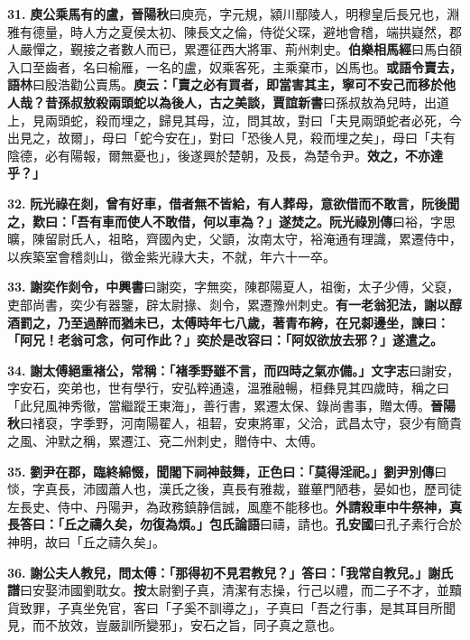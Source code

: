 \textbf{31.} \textbf{庾公乘馬有的盧，}{\footnotesize \textbf{晉陽秋}曰庾亮，字元規，潁川鄢陵人，明穆皇后長兄也，淵雅有德量，時人方之夏侯太初、陳長文之倫，侍從父琛，避地會稽，端拱嶷然，郡人嚴憚之，覲接之者數人而已，累遷征西大將軍、荊州刺史。\textbf{伯樂相馬經}曰馬白頟入口至齒者，名曰榆雁，一名的盧，奴乘客死，主乘棄市，凶馬也。}\textbf{或語令賣去，}{\footnotesize \textbf{語林}曰殷浩勸公賣馬。}\textbf{庾云：「賣之必有買者，即當害其主，寧可不安己而移於他人哉？昔孫叔敖殺兩頭蛇以為後人，古之美談，}{\footnotesize \textbf{賈誼新書}曰孫叔敖為兒時，出道上，見兩頭蛇，殺而埋之，歸見其母，泣，問其故，對曰「夫見兩頭蛇者必死，今出見之，故爾」，母曰「蛇今安在」，對曰「恐後人見，殺而埋之矣」，母曰「夫有陰德，必有陽報，爾無憂也」，後遂興於楚朝，及長，為楚令尹。}\textbf{效之，不亦達乎？」}

\textbf{32.} \textbf{阮光祿在剡，曾有好車，借者無不皆給，有人葬母，意欲借而不敢言，阮後聞之，歎曰：「吾有車而使人不敢借，何以車為？」遂焚之。}{\footnotesize \textbf{阮光祿別傳}曰裕，字思曠，陳留尉氏人，祖略，齊國內史，父顗，汝南太守，裕淹通有理識，累遷侍中，以疾築室會稽剡山，徵金紫光祿大夫，不就，年六十一卒。}

\textbf{33.} \textbf{謝奕作剡令，}{\footnotesize \textbf{中興書}曰謝奕，字無奕，陳郡陽夏人，祖衡，太子少傅，父裒，吏部尚書，奕少有器鑒，辟太尉掾、剡令，累遷豫州刺史。}\textbf{有一老翁犯法，謝以醇酒罰之，乃至過醉而猶未已，太傅時年七八歲，著青布絝，在兄厀邊坐，諫曰：「阿兄！老翁可念，何可作此？」奕於是改容曰：「阿奴欲放去邪？」遂遣之。}

\textbf{34.} \textbf{謝太傅絕重褚公，常稱：「褚季野雖不言，而四時之氣亦備。」}{\footnotesize \textbf{文字志}曰謝安，字安石，奕弟也，世有學行，安弘粹通遠，溫雅融暢，桓彝見其四歲時，稱之曰「此兒風神秀徹，當繼蹤王東海」，善行書，累遷太保、錄尚書事，贈太傅。\textbf{晉陽秋}曰禇裒，字季野，河南陽翟人，祖䂮，安東將軍，父洽，武昌太守，裒少有簡貴之風、沖默之稱，累遷江、兗二州刺史，贈侍中、太傅。}

\textbf{35.} \textbf{劉尹在郡，臨終綿惙，聞閣下祠神鼓舞，正色曰：「莫得淫祀。」}{\footnotesize \textbf{劉尹別傳}曰惔，字真長，沛國蕭人也，漢氏之後，真長有雅裁，雖蓽門陋巷，晏如也，歷司徒左長史、侍中、丹陽尹，為政務鎮静信誠，風塵不能移也。}\textbf{外請殺車中牛祭神，真長答曰：「丘之禱久矣，勿復為煩。」}{\footnotesize \textbf{包氏論語}曰禱，請也。\textbf{孔安國}曰孔子素行合於神明，故曰「丘之禱久矣」。}

\textbf{36.} \textbf{謝公夫人教兒，問太傅：「那得初不見君教兒？」答曰：「我常自教兒。」}{\footnotesize \textbf{謝氏譜}曰安娶沛國劉耽女。\textbf{按}太尉劉子真，清潔有志操，行己以禮，而二子不才，並黷貨致罪，子真坐免官，客曰「子奚不訓導之」，子真曰「吾之行事，是其耳目所聞見，而不放效，豈嚴訓所變邪」，安石之旨，同子真之意也。}

